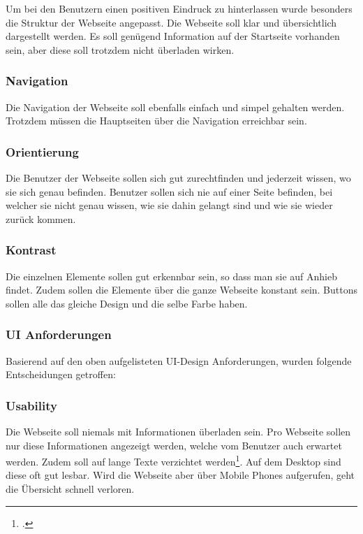 Um bei den Benutzern einen positiven Eindruck zu hinterlassen wurde besonders die Struktur der Webseite angepasst. Die Webseite soll klar und übersichtlich dargestellt werden. Es soll genügend Information auf der Startseite vorhanden sein, aber diese soll trotzdem nicht überladen wirken.

\subsubsection*{Navigation}
Die Navigation der Webseite soll ebenfalls einfach und simpel gehalten werden. Trotzdem müssen die Hauptseiten über die Navigation erreichbar sein.
		
\subsubsection*{Orientierung}
Die Benutzer der Webseite sollen sich gut zurechtfinden und jederzeit wissen, wo sie sich genau befinden. Benutzer sollen sich nie auf einer Seite befinden, bei welcher sie nicht genau wissen, wie sie dahin gelangt sind und wie sie wieder zurück kommen.

\subsubsection*{Kontrast}
Die einzelnen Elemente sollen gut erkennbar sein, so dass man sie auf Anhieb findet. Zudem sollen die Elemente über die ganze Webseite konstant sein. Buttons sollen alle das gleiche Design und die selbe Farbe haben.

\subsubsection{UI Anforderungen}
Basierend auf den oben aufgelisteten UI-Design Anforderungen, wurden folgende Entscheidungen getroffen:

\subsubsection*{Usability}
Die Webseite soll niemals mit Informationen überladen sein. Pro Webseite sollen nur diese Informationen angezeigt werden, welche vom Benutzer auch erwartet werden. Zudem soll auf lange Texte verzichtet werden\footcite{usability}. Auf dem Desktop sind diese oft gut lesbar. Wird die Webseite aber über Mobile Phones aufgerufen, geht die Übersicht schnell verloren. \\

